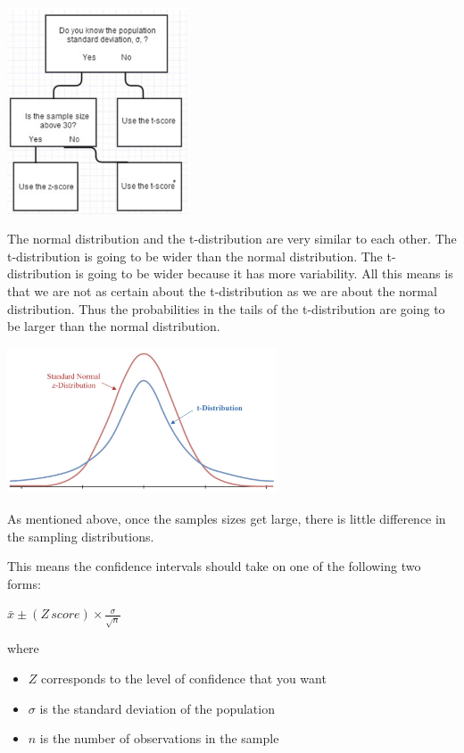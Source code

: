 \documentclass[
  letterpaper,
  DIV=11,
  numbers=noendperiod]{scrreprt}
\providecommand{\tightlist}{%
  \setlength{\itemsep}{0pt}\setlength{\parskip}{0pt}}\usepackage{longtable,booktabs,array}
\begin{document}
\includegraphics[width=0.4\textwidth,height=\textheight]{./images/EPCI_7.jpg}

The normal distribution and the t-distribution are very similar to each
other. The t-distribution is going to be wider than the normal
distribution. The t-distribution is going to be wider because it has
more variability. All this means is that we are not as certain about the
t-distribution as we are about the normal distribution. Thus the
probabilities in the tails of the t-distribution are going to be larger
than the normal distribution.

\includegraphics[width=0.6\textwidth,height=\textheight]{./images/EPCI_8.jpg}

As mentioned above, once the samples sizes get large, there is little
difference in the sampling distributions.

This means the confidence intervals should take on one of the following
two forms:

\(\displaystyle{\bar{x} \pm (Z\,score) \times \frac{\sigma}{\sqrt{n}}}\)

where

\begin{itemize}
\tightlist
\item
  \(Z\) corresponds to the level of confidence that you want
\item
  \(\sigma\) is the standard deviation of the population
\item
  \(n\) is the number of observations in the sample
\end{itemize}
\end{document}
